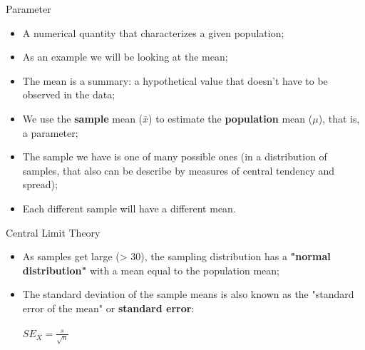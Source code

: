 \documentclass[10pt]{beamer}   %
\begin{document}
\begin{frame}{Parameter}

\begin{itemize}
\item A numerical quantity that characterizes a given population;
\item As an example we will be looking at the mean;
\item The mean is a summary: a hypothetical value that doesn't have to be observed in the data;
    \item We use the \textbf{sample} mean ($\bar{x}$) to estimate the \textbf{population} mean ($\mu$), that is, a parameter;
    \item The sample we have is one of many possible ones (in a distribution of samples, that also can be describe by measures of central tendency and spread); 
\item Each different sample will have a different mean.
\end{itemize}


\end{frame}


\begin{frame}{Central Limit Theory}
    
\begin{itemize}

\item As samples get large (> 30), the sampling distribution has a \textbf{"normal distribution"} with a mean equal to the population mean; 
\item The standard deviation of the sample means is also known as the "standard error of the mean"  or \textbf{standard error}: \\~\\  $SE_{\bar{X}}=\frac{s}{\sqrt{n}}$  


\end{itemize}

\end{frame}



\end{document}
